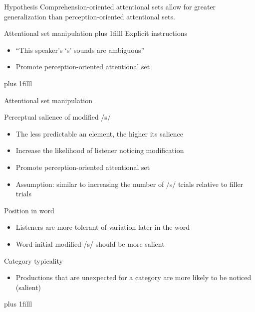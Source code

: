 \documentclass{beamer}
\newcommand{\btVFill}{\vskip0pt plus 1filll}
\begin{document}
\begin{frame}{Hypothesis}
\vfill
Comprehension-oriented attentional sets allow for greater generalization than perception-oriented attentional sets.
\vfill
\end{frame}

\begin{frame}{Attentional set manipulation}
\btVFill
Explicit instructions
\begin{itemize}
\item ``This speaker's `s' sounds are ambiguous''
\item Promote perception-oriented attentional set
\end{itemize}

\btVFill
\begin{flushright}
\scriptsize
\citet{Pitt2012}
\end{flushright}
\end{frame}

\begin{frame}{Attentional set manipulation}

Perceptual salience of modified /s/
\begin{itemize}
\item The less predictable an element, the higher its salience
\item Increase the likelihood of listener noticing modification
\item Promote perception-oriented attentional set
\item Assumption: similar to increasing the number of /s/ trials relative to filler trials
\end{itemize}

Position in word
\begin{itemize}
\item Listeners are more tolerant of variation later in the word
\item Word-initial modified /s/ should be more salient 
\end{itemize}

Category typicality
\begin{itemize}
\item Productions that are unexpected for a category are more likely to be noticed (salient)
\end{itemize}

\btVFill
\begin{flushright}
\scriptsize
\citet{Pitt2012}
\end{flushright}
\end{frame}
\end{document}
